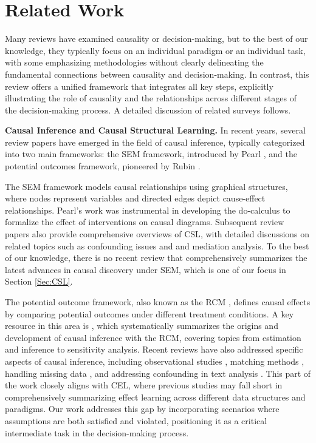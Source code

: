 \section{Related Work} \label{sec::related_work}
Many reviews have examined causality or decision-making, but to the best of our knowledge, they typically focus on an individual paradigm or an individual task, with some emphasizing methodologies without clearly delineating the fundamental connections between causality and decision-making. In contrast, this review offers a unified framework that integrates all key steps, explicitly illustrating the role of causality and the relationships across different stages of the decision-making process. A detailed discussion of related surveys follows.

\noindent \textbf{Causal Inference and Causal Structural Learning.} In recent years, several review papers have emerged in the field of causal inference, typically categorized into two main frameworks: the \acrfull{SEM} framework, introduced by Pearl \citep{pearl1995causal}, and the potential outcomes framework, pioneered by Rubin \citep{rubin1974estimating, rubin1978bayesian}.

The \acrshort{SEM} framework models causal relationships using graphical structures, where nodes represent variables and directed edges depict cause-effect relationships. Pearl’s work \citep{pearl2003statistics} was instrumental in developing the do-calculus to formalize the effect of interventions on causal diagrams. Subsequent review papers \citep{pearl2009causal, pearl2010causal, pearl2010foundations} also provide comprehensive overviews of \acrshort{CSL}, with detailed discussions on related topics such as confounding issues and and mediation analysis. To the best of our knowledge, there is no recent review that comprehensively summarizes the latest advances in causal discovery under \acrshort{SEM}, which is one of our focus in Section \ref{Sec:CSL}.

The potential outcome framework, also known as the \acrfull{RCM} \citep{rubin1974estimating}, defines causal effects by comparing potential outcomes under different treatment conditions. A key resource in this area is \citet{imbens2015causal}, which systematically summarizes the origins and development of causal inference with the \acrshort{RCM}, covering topics from estimation and inference to sensitivity analysis. Recent reviews have also addressed specific aspects of causal inference, including observational studies \citep{yao2021survey}, matching methods \citep{stuart2010matching}, handling missing data \citep{ding2018causal}, and addressing confounding in text analysis \citep{keith2020text}. This part of the work closely aligns with \acrshort{CEL}, where previous studies may fall short in comprehensively summarizing effect learning across different data structures and paradigms. Our work addresses this gap by incorporating scenarios where assumptions are both satisfied and violated, positioning it as a critical intermediate task in the decision-making process.

